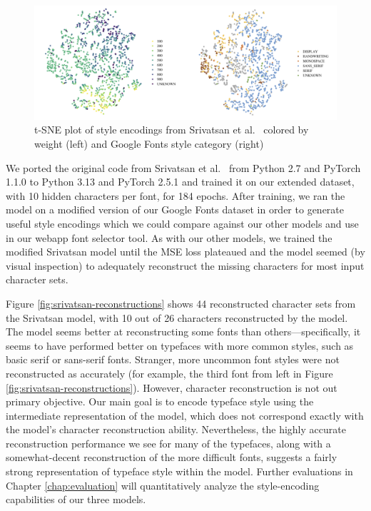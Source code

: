 \begin{figure}[h]
    \centering
    \includegraphics[width=\textwidth]{images/srivatsan-tsne.png}
    \caption{t-SNE plot of style encodings from Srivatsan et al.\ \cite{srivatsan2020} colored by weight (left) and Google Fonts style category (right)}
    \label{fig:srivatsan-tsne}
\end{figure}

We ported the original code from Srivatsan et al.\ \cite{srivatsan2020} from Python 2.7 and PyTorch 1.1.0 to Python 3.13 and PyTorch 2.5.1 and trained it on our extended dataset, with 10 hidden characters per font, for 184 epochs. After training, we ran the model on a modified version of our Google Fonts dataset in order to generate useful style encodings which we could compare against our other models and use in our webapp font selector tool. As with our other models, we trained the modified Srivatsan model until the MSE loss plateaued and the model seemed (by visual inspection) to adequately reconstruct the missing characters for most input character sets.

Figure \ref{fig:srivatsan-reconstructions} shows 44 reconstructed character sets from the Srivatsan model, with 10 out of 26 characters reconstructed by the model. The model seems better at reconstructing some fonts than others---specifically, it seems to have performed better on typefaces with more common styles, such as basic serif or sans-serif fonts. Stranger, more uncommon font styles were not reconstructed as accurately (for example, the third font from left in Figure \ref{fig:srivatsan-reconstructions}). However, character reconstruction is not out primary objective. Our main goal is to encode typeface style using the intermediate representation of the model, which does not correspond exactly with the model's character reconstruction ability. Nevertheless, the highly accurate reconstruction performance we see for many of the typefaces, along with a somewhat-decent reconstruction of the more difficult fonts, suggests a fairly strong representation of typeface style within the model. Further evaluations in Chapter \ref{chap:evaluation} will quantitatively analyze the style-encoding capabilities of our three models.

